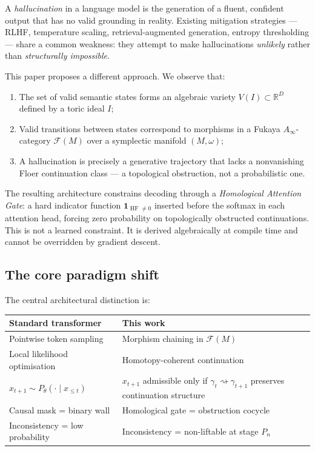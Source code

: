 \documentclass[11pt,a4paper]{article}
\DeclareMathOperator{\HF}{HF}
\newcommand{\one}{\mathbf{1}}
\newcommand{\Fuk}{\mathcal{F}}
\begin{document}
A \emph{hallucination} in a language model is the generation of a
fluent, confident output that has no valid grounding in reality.
Existing mitigation strategies --- RLHF, temperature scaling,
retrieval-augmented generation, entropy thresholding --- share a
common weakness: they attempt to make hallucinations \emph{unlikely}
rather than \emph{structurally impossible}.

This paper proposes a different approach. We observe that:
\begin{enumerate}[label=(\roman*)]
  \item The set of valid semantic states forms an algebraic variety
        $V(I) \subset \mathbb{R}^D$ defined by a toric ideal $I$;
  \item Valid transitions between states correspond to morphisms in
        a Fukaya $A_\infty$-category $\Fuk(M)$ over a symplectic
        manifold $(M,\omega)$;
  \item A hallucination is precisely a generative trajectory that
        lacks a nonvanishing Floer continuation class --- a
        topological obstruction, not a probabilistic one.
\end{enumerate}

The resulting architecture constrains decoding through a
\emph{Homological Attention Gate}: a hard indicator function
$\one_{\HF \neq 0}$ inserted before the softmax in each attention
head, forcing zero probability on topologically obstructed
continuations. This is not a learned constraint. It is derived
algebraically at compile time and cannot be overridden by gradient
descent.

\subsection{The core paradigm shift}

The central architectural distinction is:

\begin{center}
\renewcommand{\arraystretch}{1.4}
\begin{tabular}{p{5cm}p{6.5cm}}
\toprule
\textbf{Standard transformer} & \textbf{This work} \\
\midrule
Pointwise token sampling & Morphism chaining in $\Fuk(M)$ \\
Local likelihood optimisation & Homotopy-coherent continuation \\
$x_{t+1} \sim P_\theta(\cdot \mid x_{\leq t})$ &
  $x_{t+1}$ admissible only if $\gamma_t \rightsquigarrow \gamma_{t+1}$
  preserves continuation structure \\
Causal mask = binary wall & Homological gate = obstruction cocycle \\
Inconsistency = low probability & Inconsistency = non-liftable at stage $P_n$ \\
\bottomrule
\end{tabular}
\end{center}
\end{document}
